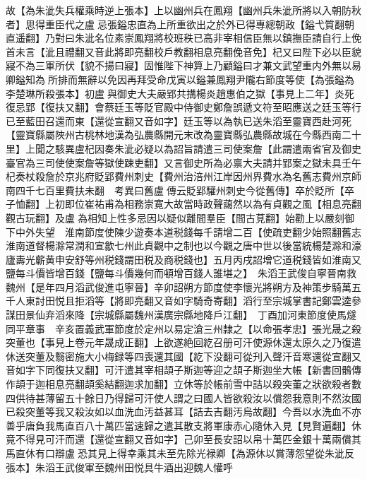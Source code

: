 故【為朱泚失兵權乘時逆上張本】上以幽州兵在鳳翔【幽州兵朱泚所將以入朝防秋者】思得重臣代之盧忌張鎰忠直為上所重欲出之於外已得專總朝政【鎰弋質翻朝直遥翻】乃對曰朱泚名位素崇鳳翔將校班秩已高非宰相信臣無以鎮撫臣請自行上俛首未言【泚且禮翻又音此將即亮翻校戶教翻相息亮翻俛音免】杞又曰陛下必以臣貌寢不為三軍所伏【貌不揚曰寢】固惟陛下神算上乃顧鎰曰才兼文武望重内外無以易卿鎰知為所排而無辭以免因再拜受命戊寅以鎰兼鳳翔尹隴右節度等使【為張鎰為李楚琳所殺張本】初盧與御史大夫嚴郢共搆楊炎趙惠伯之獄【事見上二年】炎死復忌郢【復扶又翻】會蔡廷玉等貶官殿中侍御史鄭詹誤遞文符至昭應送之廷玉等行已至藍田召還而東【還從宣翻又音如字】廷玉等以為執已送朱滔至靈寶西赴河死【靈寶縣屬陜州古桃林地漢為弘農縣開元末改為靈寶縣弘農縣故城在今縣西南二十里】上聞之駭異盧杞因奏朱泚必疑以為詔旨請遣三司使案詹【此謂遣兩省官及御史臺官為三司使使案詹等獄使踈吏翻】又言御史所為必禀大夫請并郢案之獄未具壬午杞奏杖殺詹於京兆府貶郢費州刺史【費州治涪州江岸因州界費水為名舊志費州京師南四千七百里費扶未翻　考異曰舊盧傳云貶郢驩州刺史今從舊傳】卒於貶所【卒子恤翻】上初即位崔祐甫為相務崇寛大故當時政聲藹然以為有貞觀之風【相息亮翻觀古玩翻】及盧為相知上性多忌因以疑似離間羣臣【間古莧翻】始勸上以嚴刻御下中外失望　淮南節度使陳少遊奏本道税錢每千請增二百【使疏吏翻少始照翻舊志淮南道督楊滁常潤和宣歙七州此貞觀中之制也以今觀之唐中世以後當統楊楚滁和濠廬夀光蘄黄申安舒等州税錢謂田税及商税錢也】五月丙戌詔增它道税錢皆如淮南又鹽每斗價皆增百錢【鹽每斗價幾何而頓增百錢人誰堪之】　朱滔王武俊自寧晉南救魏州【是年四月滔武俊進屯寧晉】辛卯詔朔方節度使李懷光將朔方及神策步騎萬五千人東討田悦且拒滔等【將即亮翻又音如字騎奇寄翻】滔行至宗城掌書記鄭雲逵參謀田景仙弃滔來降【宗城縣屬魏州漢廣宗縣地降戶江翻】　丁酉加河東節度使馬燧同平章事　辛亥置義武軍節度於定州以易定滄三州隸之【以命張孝忠】張光晟之殺突董也【事見上卷元年晟成正翻】上欲遂絶回紇召册可汗使源休還太原久之乃復遣休送突董及翳密施大小梅録等四喪還其國【紇下没翻可從刋入聲汗音寒還從宣翻又音如字下同復扶又翻】可汗遣其宰相頡子斯迦等迎之頡子斯迦坐大帳【新書回鶻傳作頡于迦相息亮翻頡奚結翻迦求加翻】立休等於帳前雪中詰以殺突董之狀欲殺者數四供待甚薄留五十餘日乃得歸可汗使人謂之曰國人皆欲殺汝以償怨我意則不然汝國已殺突董等我又殺汝如以血洗血汚益甚耳【詰去吉翻汚烏故翻】今吾以水洗血不亦善乎唐負我馬直百八十萬匹當速歸之遣其散支將軍康赤心隨休入見【見賢遍翻】休竟不得見可汗而還【還從宣翻又音如字】己卯至長安詔以帛十萬匹金銀十萬兩償其馬直休有口辯盧恐其見上得幸乘其未至先除光禄卿【為源休以賞薄怨望從朱泚反張本】朱滔王武俊軍至魏州田悦具牛酒出迎魏人懽呼

